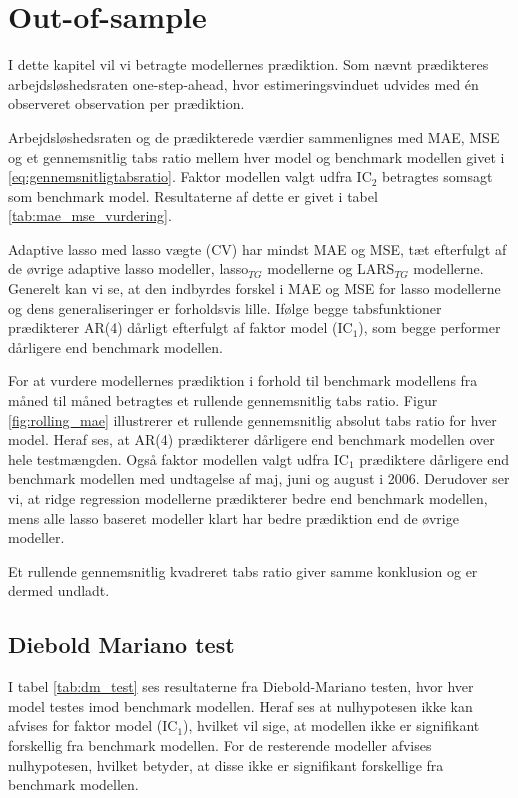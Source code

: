 \chapter{Out-of-sample} \label{ch:out-of-sample}
I dette kapitel vil vi betragte modellernes prædiktion.
Som nævnt prædikteres arbejdsløshedsraten one-step-ahead, hvor estimeringsvinduet udvides med én observeret observation per prædiktion.

Arbejdsløshedsraten og de prædikterede værdier sammenlignes med MAE, MSE og et gennemsnitlig tabs ratio mellem hver model og benchmark modellen givet i \eqref{eq:gennemsnitligtabsratio}.
Faktor modellen valgt udfra IC\(_2\) betragtes somsagt som benchmark model.
Resultaterne af dette er givet i tabel \ref{tab:mae_mse_vurdering}.



Adaptive lasso med lasso vægte (CV) har mindst MAE og MSE, tæt efterfulgt af de øvrige adaptive lasso modeller, lasso\(_{TG}\) modellerne og LARS\(_{TG}\) modellerne.
Generelt kan vi se, at den indbyrdes forskel i MAE og MSE for lasso modellerne og dens generaliseringer er forholdsvis lille.
Ifølge begge tabsfunktioner prædikterer AR(4) dårligt efterfulgt af faktor model (IC\(_1\)), som begge performer dårligere end benchmark modellen.

For at vurdere modellernes prædiktion i forhold til benchmark modellens fra måned til måned betragtes et rullende gennemsnitlig tabs ratio.
Figur \ref{fig:rolling_mae} illustrerer et rullende gennemsnitlig absolut tabs ratio for hver model. 
Heraf ses, at AR(4) prædikterer dårligere end benchmark modellen over hele testmængden.
Også faktor modellen valgt udfra IC$_1$ prædiktere dårligere end benchmark modellen med undtagelse af maj, juni og august i 2006.
Derudover ser vi, at ridge regression modellerne prædikterer bedre end benchmark modellen, mens alle lasso baseret modeller klart har bedre prædiktion end de øvrige modeller.
%

Et rullende gennemsnitlig kvadreret tabs ratio giver samme konklusion og er dermed undladt.


\section{Diebold Mariano test}
I tabel \ref{tab:dm_test} ses resultaterne fra Diebold-Mariano testen, hvor hver model testes imod benchmark modellen.
Heraf ses at nulhypotesen ikke kan afvises for faktor model (IC\(_1\)), hvilket vil sige, at modellen ikke er signifikant forskellig fra benchmark modellen.
For de resterende modeller afvises nulhypotesen, hvilket betyder, at disse ikke er signifikant forskellige fra benchmark modellen.
%

%
\newpage
